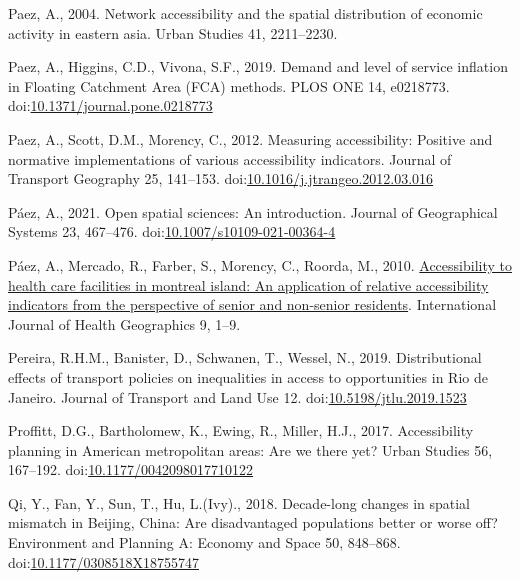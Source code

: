 \documentclass[]{elsarticle} %
\newlength{\cslhangindent}
\newlength{\cslentryspacingunit} %
\newenvironment{CSLReferences}[2] %
 {%
  \setlength{\parindent}{0pt}
  \ifodd #1
  \let\oldpar\par
  \def\par{\hangindent=\cslhangindent\oldpar}
  \fi
  \setlength{\parskip}{#2\cslentryspacingunit}
 }%
 {}
\begin{document}
\begin{CSLReferences}{1}{0}
\leavevmode{}%
Paez, A., 2004. Network accessibility and the spatial distribution of
economic activity in eastern asia. Urban Studies 41, 2211--2230.

\leavevmode{}%
Paez, A., Higgins, C.D., Vivona, S.F., 2019. Demand and level of service
inflation in Floating Catchment Area (FCA) methods. PLOS ONE 14,
e0218773.
doi:\href{https://doi.org/10.1371/journal.pone.0218773}{10.1371/journal.pone.0218773}

\leavevmode{}%
Paez, A., Scott, D.M., Morency, C., 2012. Measuring accessibility:
Positive and normative implementations of various accessibility
indicators. Journal of Transport Geography 25, 141--153.
doi:\href{https://doi.org/10.1016/j.jtrangeo.2012.03.016}{10.1016/j.jtrangeo.2012.03.016}

\leavevmode{}%
Páez, A., 2021. Open spatial sciences: An introduction. Journal of
Geographical Systems 23, 467--476.
doi:\href{https://doi.org/10.1007/s10109-021-00364-4}{10.1007/s10109-021-00364-4}

\leavevmode{}%
Páez, A., Mercado, R., Farber, S., Morency, C., Roorda, M., 2010.
\href{http://www.ij-healthgeographics.com/content/9/1/52}{Accessibility
to health care facilities in montreal island: An application of relative
accessibility indicators from the perspective of senior and non-senior
residents}. International Journal of Health Geographics 9, 1--9.

\leavevmode{}%
Pereira, R.H.M., Banister, D., Schwanen, T., Wessel, N., 2019.
Distributional effects of transport policies on inequalities in access
to opportunities in {Rio} de {Janeiro}. Journal of Transport and Land
Use 12.
doi:\href{https://doi.org/10.5198/jtlu.2019.1523}{10.5198/jtlu.2019.1523}

\leavevmode{}%
Proffitt, D.G., Bartholomew, K., Ewing, R., Miller, H.J., 2017.
Accessibility planning in American metropolitan areas: Are we there yet?
Urban Studies 56, 167--192.
doi:\href{https://doi.org/10.1177/0042098017710122}{10.1177/0042098017710122}

\leavevmode{}%
Qi, Y., Fan, Y., Sun, T., Hu, L.(Ivy)., 2018. Decade-long changes in
spatial mismatch in {Beijing}, {China}: {Are} disadvantaged populations
better or worse off? Environment and Planning A: Economy and Space 50,
848--868.
doi:\href{https://doi.org/10.1177/0308518X18755747}{10.1177/0308518X18755747}


\end{CSLReferences}
\end{document}
